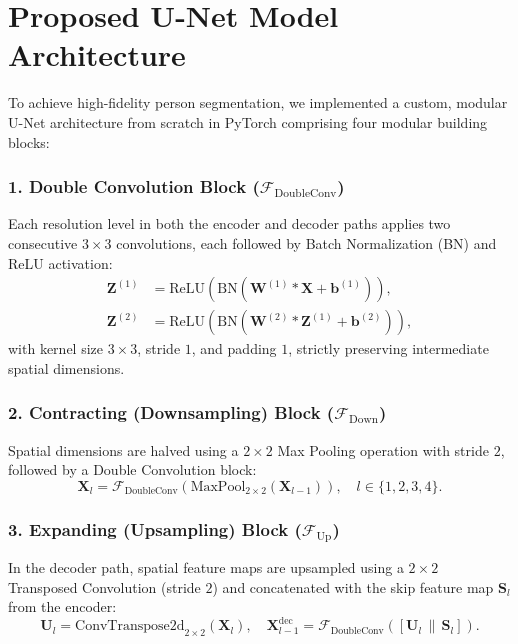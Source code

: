 \documentclass[10pt,a4paper]{report}
\begin{document}
\section{Proposed U-Net Model Architecture}
To achieve high-fidelity person segmentation, we implemented a custom, modular U-Net \cite{ronneberger2015unet} architecture from scratch in PyTorch \cite{paszke2019pytorch} comprising four modular building blocks:

\subsubsection{1. Double Convolution Block ($\mathcal{F}_{\text{DoubleConv}}$)}
Each resolution level in both the encoder and decoder paths applies two consecutive $3 \times 3$ convolutions, each followed by Batch Normalization (BN) and ReLU activation:
\begin{align}
\mathbf{Z}^{(1)} &= \text{ReLU}\left(\text{BN}\left(\mathbf{W}^{(1)} * \mathbf{X} + \mathbf{b}^{(1)}\right)\right), \\
\mathbf{Z}^{(2)} &= \text{ReLU}\left(\text{BN}\left(\mathbf{W}^{(2)} * \mathbf{Z}^{(1)} + \mathbf{b}^{(2)}\right)\right),
\end{align}
with kernel size $3 \times 3$, stride $1$, and padding $1$, strictly preserving intermediate spatial dimensions.

\subsubsection{2. Contracting (Downsampling) Block ($\mathcal{F}_{\text{Down}}$)}
Spatial dimensions are halved using a $2 \times 2$ Max Pooling operation with stride $2$, followed by a Double Convolution block:
\begin{equation}
\mathbf{X}_{l} = \mathcal{F}_{\text{DoubleConv}}\left(\text{MaxPool}_{2\times 2}(\mathbf{X}_{l-1})\right), \quad l \in \{1, 2, 3, 4\}.
\end{equation}

\subsubsection{3. Expanding (Upsampling) Block ($\mathcal{F}_{\text{Up}}$)}
In the decoder path, spatial feature maps are upsampled using a $2 \times 2$ Transposed Convolution (stride $2$) and concatenated with the skip feature map $\mathbf{S}_l$ from the encoder:
\begin{equation}
\mathbf{U}_l = \text{ConvTranspose2d}_{2\times 2}(\mathbf{X}_{l}), \quad \mathbf{X}_{l-1}^{\text{dec}} = \mathcal{F}_{\text{DoubleConv}}\left(\left[\mathbf{U}_l \,\|\, \mathbf{S}_l\right]\right).
\end{equation}
\end{document}
